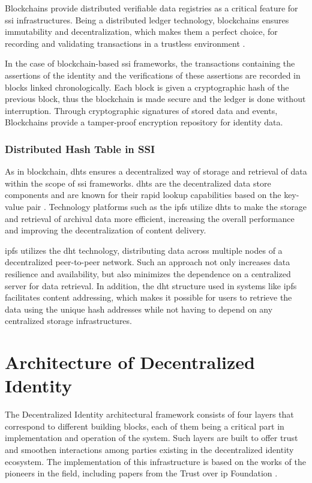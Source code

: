 Blockchains provide distributed verifiable data registries as a critical feature for \gls{ssi} infrastructures. Being a distributed ledger technology, blockchains ensures 
immutability and decentralization, which makes them a perfect choice, for recording and validating transactions in a trustless environment \cite{9869618}.

In the case of blockchain-based \gls{ssi} frameworks, the transactions containing the assertions of the identity and the verifications of these assertions are recorded in blocks 
linked chronologically. Each block is given a cryptographic hash of the previous block, thus the blockchain is made secure and the ledger is done without interruption. 
Through cryptographic signatures of stored data and events, Blockchains provide a tamper-proof encryption repository for identity data.

\subsubsection{Distributed Hash Table in SSI}

As in blockchain, \gls{dht}s ensures a decentralized way of storage and retrieval of data within the scope of \gls{ssi} frameworks. \gls{dht}s are the decentralized 
data store components and are known for their rapid lookup capabilities based on the key-value pair \cite{9869618}. Technology platforms such as the \gls{ipfs} 
utilize \gls{dht}s to make the storage and retrieval of archival data more efficient, increasing the overall performance and improving the decentralization of content delivery.

\gls{ipfs} utilizes the \gls{dht} technology, distributing data across multiple nodes of a decentralized peer-to-peer network. Such an approach not only increases data resilience and 
availability, but also minimizes the dependence on a centralized server for data retrieval. In addition, the \gls{dht} structure used in systems like \gls{ipfs} facilitates content 
addressing, which makes it possible for users to retrieve the data using the unique hash addresses while not having to depend on any centralized storage infrastructures.

\section{Architecture of Decentralized Identity} 

The Decentralized Identity architectural framework consists of four layers that correspond to different building blocks, each of them being a critical part in implementation
and operation of the system. Such layers are built to offer trust and smoothen interactions among parties existing in the decentralized identity ecosystem. The 
implementation of this infrastructure is based on the works of the pioneers in the field, including papers from the Trust over \gls{ip} Foundation \cite{DIDarchitecture}.

